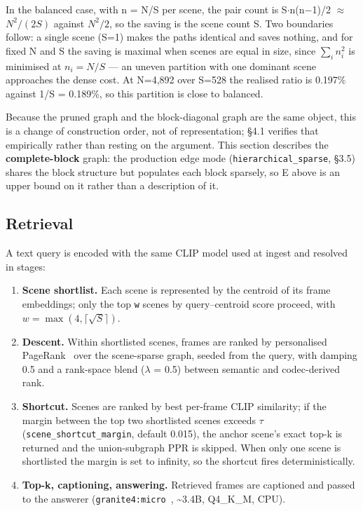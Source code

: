 \documentclass[sigconf,review,anonymous]{acmart}
\providecommand{\tightlist}{\setlength{\itemsep}{0pt}\setlength{\parskip}{0pt}}
\begin{document}
In the balanced case, with n = N/S per scene, the pair count is S\ensuremath{\cdot}n(n\ensuremath{-}1)/2 \ensuremath{\approx} \(N^2/(2S)\) against
\(N^2/2\), so the saving is the scene count S. Two boundaries follow: a single scene (S=1) makes
the paths identical and saves nothing, and for fixed N and S the saving is maximal when
scenes are equal in size, since \(\sum_i n_i^2\) is minimised at \(n_i = N/S\) --- an uneven partition with
one dominant scene approaches the dense cost. At N=4,892 over S=528 the realised ratio is
0.197\% against 1/S = 0.189\%, so this partition is close to balanced.

Because the pruned graph and the block-diagonal graph are the same object, this is a change
of construction order, not of representation; §4.1 verifies that empirically rather than
resting on the argument. This section describes the \textbf{complete-block} graph: the production
edge mode (\texttt{hierarchical\_sparse}, §3.5) shares the block structure but populates each block
sparsely, so \textbar E\textbar{} above is an upper bound on it rather than a description of it.

\subsection{Retrieval}

A text query is encoded with the same CLIP model used at ingest and resolved in stages:

\begin{enumerate}
\def\labelenumi{\arabic{enumi}.}
\tightlist
\item
  \textbf{Scene shortlist.} Each scene is represented by the centroid of its frame embeddings;
  only the top \texttt{w} scenes by query--centroid score proceed, with \(w = \max(4, \lceil\sqrt{S}\rceil)\).
\item
  \textbf{Descent.} Within shortlisted scenes, frames are ranked by personalised PageRank~\cite{page1999pagerank,haveliwala2002topic} over
  the scene-sparse graph, seeded from the query, with damping 0.5 and a rank-space blend
  (\ensuremath{\lambda} = 0.5) between semantic and codec-derived rank.
\item
  \textbf{Shortcut.} Scenes are ranked by best per-frame CLIP similarity; if the margin between
  the top two shortlisted scenes exceeds \ensuremath{\tau} (\texttt{scene\_shortcut\_margin}, default 0.015), the
  anchor scene's exact top-k is returned and the union-subgraph PPR is skipped. When only
  one scene is shortlisted the margin is set to infinity, so the shortcut fires
  deterministically.
\item
  \textbf{Top-k, captioning, answering.} Retrieved frames are captioned and passed to the
  answerer (\texttt{granite4:micro}~\cite{ibm2025granite4}, \textasciitilde3.4B, Q4\_K\_M, CPU).
\end{enumerate}
\end{document}
